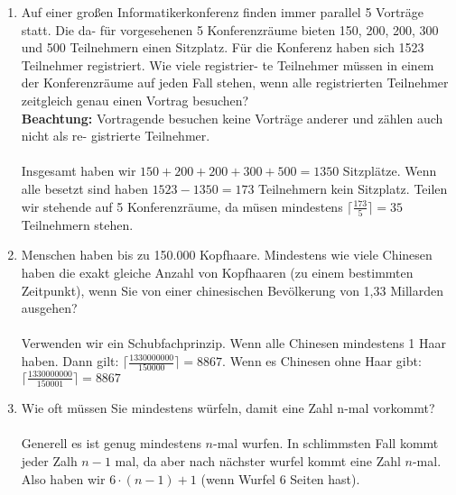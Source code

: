\begin{enumerate}[label=(\alph*)]
        \item Auf einer großen Informatikerkonferenz finden immer parallel 5 Vorträge statt. Die da-
		für vorgesehenen 5 Konferenzräume bieten 150, 200, 200, 300 und 500 Teilnehmern einen
		Sitzplatz. Für die Konferenz haben sich 1523 Teilnehmer registriert. Wie viele registrier-
		te Teilnehmer müssen in einem der Konferenzräume auf jeden Fall stehen, wenn alle
		registrierten Teilnehmer zeitgleich genau einen Vortrag besuchen?\\
		\textbf{Beachtung:} Vortragende besuchen keine Vorträge anderer und zählen auch nicht als re-
		gistrierte Teilnehmer.\\\\
		Insgesamt haben wir $150+200+200+300+500 = 1350$ Sitzpl\"atze. Wenn alle besetzt sind haben 
		$1523-1350=173$ Teilnehmern kein Sitzplatz. Teilen wir stehende auf 5 Konferenzräume, da 
		m\"usen mindestens $\Big\lceil\frac{173}{5}\Big\rceil = 35$ Teilnehmern stehen. 
        
        \item Menschen haben bis zu 150.000 Kopfhaare. Mindestens wie viele Chinesen haben die
		exakt gleiche Anzahl von Kopfhaaren (zu einem bestimmten Zeitpunkt), wenn Sie von
		einer chinesischen Bevölkerung von 1,33 Millarden ausgehen?\\\\
		Verwenden wir ein Schubfachprinzip. Wenn alle Chinesen mindestens 1 Haar haben.
		Dann gilt: $\bigg\lceil\frac{1330000000}{150000}\bigg\rceil = 8867$. 
		Wenn es Chinesen ohne Haar gibt: $\bigg\lceil\frac{1330000000}{150001}\bigg\rceil = 8867$
		
        \item Wie oft müssen Sie mindestens würfeln, damit eine Zahl n-mal vorkommt?\\\\
        Generell es ist genug mindestens $n$-mal wurfen. In schlimmsten Fall kommt jeder Zalh $n-1$ mal,
        da aber nach n\"achster wurfel kommt eine Zahl $n$-mal. Also haben wir $6\cdot(n-1)+1$ 
        (wenn Wurfel 6 Seiten hast).
    \end{enumerate}

